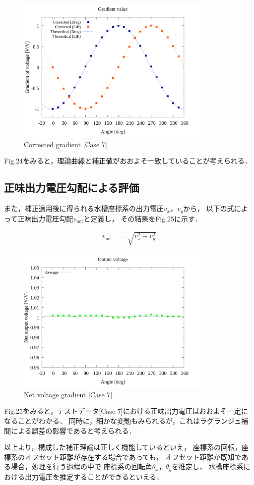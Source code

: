 \begin{figure}[htbp]
  \begin{center}
    \includegraphics[width=95mm]{../../02_workspace/result/simulation_tx=10.0_ty=-5.0_dx=5.00_dy=-2.50/plot/21/21-4_summary.png}
    \caption{Corrected gradient [Case 7]}
  \end{center}
\end{figure}

Fig.24をみると，理論曲線と補正値がおおよそ一致していることが考えられる．

\subsection{正味出力電圧勾配による評価}

また，補正適用後に得られる水槽座標系の出力電圧$v_x$，$v_y$から，
以下の式によって正味出力電圧勾配$v_{\mathrm{net}}$と定義し，
その結果をFig.25に示す．

\begin{align}
  v_{\mathrm{net}} & = \sqrt{v_x^2 + v_y^2}
\end{align}

\begin{figure}[htbp]
  \begin{center}
    \includegraphics[width=95mm]{../../02_workspace/result/simulation_tx=10.0_ty=-5.0_dx=5.00_dy=-2.50/plot/09/09_summary-outputvoltage-net.png}
    \caption{Net voltage gradient [Case 7]}
  \end{center}
\end{figure}

Fig.25をみると，テストデータ[Case 7]における正味出力電圧はおおよそ一定になることがわかる．
同時に，細かな変動もみられるが，これはラグランジュ補間による誤差の影響であると考えられる．

以上より，構成した補正理論は正しく機能しているといえ，
座標系の回転，座標系のオフセット距離が存在する場合であっても，
オフセット距離が既知である場合，処理を行う過程の中で
座標系の回転角$\theta_x$，$\theta_y$を推定し，
水槽座標系における出力電圧を推定することができるといえる．

\newpage